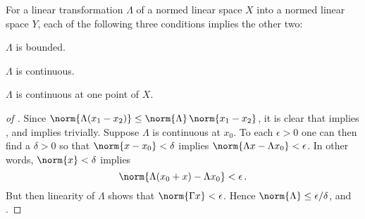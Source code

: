 \documentclass[12pt]{CrispyNotes}
\begin{document}
\begin{theorem}\label{theorem2}
    For a linear transformation $\Lambda$ of a normed linear space $X$ into a normed linear space $Y$, each of the following three conditions implies the other two:
    \begin{thmitems}
        \item\label{theorem2:a}
            $\Lambda$ is bounded.

        \item\label{theorem2:b}
            $\Lambda$ is continuous.

        \item\label{theorem2:c}
            $\Lambda$ is continuous at one point of $X$.
    \end{thmitems}
\end{theorem}
\begin{proof}[of {}]
    Since $\norm{\Lambda(x_1-x_2)} \leq \norm{\Lambda}\,\norm{x_1-x_2}$, it is clear that  implies , and  implies  trivially. Suppose $\Lambda$ is continuous at $x_0$. To each $\epsilon>0$ one can then find a $\delta>0$ so that $\norm{x-x_0}<\delta$ implies $\norm{\Lambda x - \Lambda x_0}<\epsilon$. In other words, $\norm{x}<\delta$ implies
        \begin{equation*}
            \norm{\Lambda(x_0+x)-\Lambda x_0} <\epsilon\mathp
        \end{equation*}
    But then linearity of $\Lambda$ shows that $\norm{\Gamma x}<\epsilon$. Hence $\norm{\Lambda}\leq \epsilon\slash\delta$, and .
\end{proof}
\end{document}
